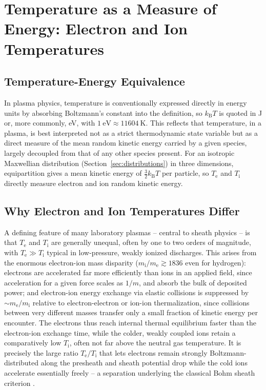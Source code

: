\section{Temperature as a Measure of Energy: Electron and Ion Temperatures}
\label{sec:temperature}

\subsection{Temperature-Energy Equivalence}

In plasma physics, temperature is conventionally expressed directly in energy units by absorbing Boltzmann's constant into the definition, so $k_{\mathrm{B}} T$ is quoted in \si{\joule} or, more commonly, \si{\electronvolt}, with $\SI{1}{\electronvolt} \approx \SI{11604}{\kelvin}$. This reflects that temperature, in a plasma, is best interpreted not as a strict thermodynamic state variable but as a direct measure of the mean random kinetic energy carried by a given species, largely decoupled from that of any other species present. For an isotropic Maxwellian distribution (Section~\ref{sec:distributions}) in three dimensions, equipartition gives a mean kinetic energy of $\tfrac{3}{2} k_{\mathrm{B}} T$ per particle, so $T_{\mathrm{e}}$ and $T_{\mathrm{i}}$ directly measure electron and ion random kinetic energy.

\subsection{Why Electron and Ion Temperatures Differ}

A defining feature of many laboratory plasmas -- central to sheath physics -- is that $T_{\mathrm{e}}$ and $T_{\mathrm{i}}$ are generally unequal, often by one to two orders of magnitude, with $T_{\mathrm{e}} \gg T_{\mathrm{i}}$ typical in low-pressure, weakly ionized discharges. This arises from the enormous electron-ion mass disparity ($m_{\mathrm{i}}/m_{\mathrm{e}} \gtrsim 1836$ even for hydrogen): electrons are accelerated far more efficiently than ions in an applied field, since acceleration for a given force scales as $1/m$, and absorb the bulk of deposited power; and electron-ion energy exchange via elastic collisions is suppressed by $\sim m_{\mathrm{e}}/m_{\mathrm{i}}$ relative to electron-electron or ion-ion thermalization, since collisions between very different masses transfer only a small fraction of kinetic energy per encounter. The electrons thus reach internal thermal equilibrium faster than the electron-ion exchange time, while the colder, weakly coupled ions retain a comparatively low $T_{\mathrm{i}}$, often not far above the neutral gas temperature. It is precisely the large ratio $T_{\mathrm{e}}/T_{\mathrm{i}}$ that lets electrons remain strongly Boltzmann-distributed along the presheath and sheath potential drop while the cold ions accelerate essentially freely -- a separation underlying the classical Bohm sheath criterion \cite{ref0004}.

